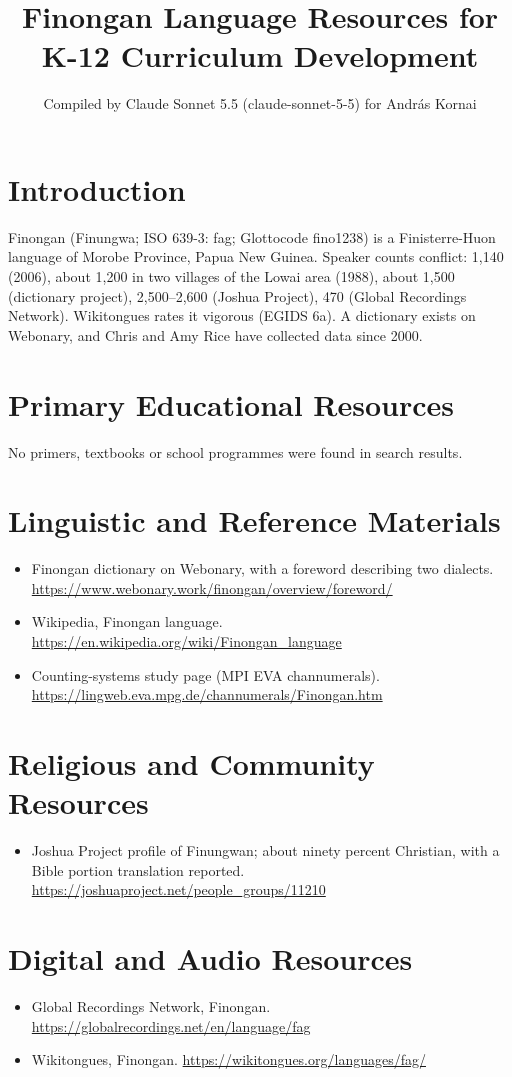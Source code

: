 \documentclass[12pt]{article}
\title{Finongan Language Resources for K-12 Curriculum Development}
\author{Compiled by Claude Sonnet 5.5 (claude-sonnet-5-5) for Andr\'as Kornai}
\date{}
\begin{document}
\maketitle

\section{Introduction}
Finongan (Finungwa; ISO 639-3: fag; Glottocode fino1238) is a Finisterre-Huon language of Morobe Province, Papua New Guinea. Speaker counts conflict: 1,140 (2006), about 1,200 in two villages of the Lowai area (1988), about 1,500 (dictionary project), 2,500--2,600 (Joshua Project), 470 (Global Recordings Network). Wikitongues rates it vigorous (EGIDS 6a). A dictionary exists on Webonary, and Chris and Amy Rice have collected data since 2000.

\section{Primary Educational Resources}
No primers, textbooks or school programmes were found in search results.

\section{Linguistic and Reference Materials}
\begin{itemize}
\item Finongan dictionary on Webonary, with a foreword describing two dialects. \url{https://www.webonary.work/finongan/overview/foreword/}
\item Wikipedia, Finongan language. \url{https://en.wikipedia.org/wiki/Finongan_language}
\item Counting-systems study page (MPI EVA channumerals). \url{https://lingweb.eva.mpg.de/channumerals/Finongan.htm}
\end{itemize}

\section{Religious and Community Resources}
\begin{itemize}
\item Joshua Project profile of Finungwan; about ninety percent Christian, with a Bible portion translation reported. \url{https://joshuaproject.net/people_groups/11210}
\end{itemize}

\section{Digital and Audio Resources}
\begin{itemize}
\item Global Recordings Network, Finongan. \url{https://globalrecordings.net/en/language/fag}
\item Wikitongues, Finongan. \url{https://wikitongues.org/languages/fag/}
\end{itemize}
\end{document}
